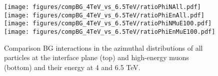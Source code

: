 \begin{figure}[!htb]
\begin{center}
  \texttt{[image: figures/compBG\_4TeV\_vs\_6.5TeV/ratioPhiNAll.pdf]}
  \texttt{[image: figures/compBG\_4TeV\_vs\_6.5TeV/ratioPhiEnAll.pdf]}
  \texttt{[image: figures/compBG\_4TeV\_vs\_6.5TeV/ratioPhiNMuE100.pdf]}
  \texttt{[image: figures/compBG\_4TeV\_vs\_6.5TeV/ratioPhiEnMuE100.pdf]}
\end{center}
\vspace{-0.6cm}
 \caption{Comparison BG interactions in the azimuthal distributions of all particles at the interface plane (top) and high-energy muons (bottom) and their energy at 4 and 6.5 TeV.
  \label{compBG}}
\end{figure}

